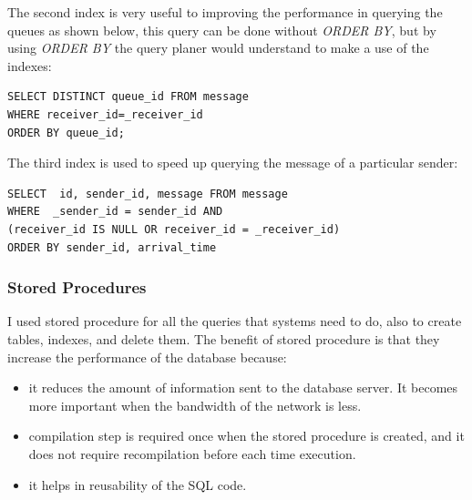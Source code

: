 \documentclass[11pt]{article}
\begin{document}
The second index is very useful to improving the performance 
in querying the queues as shown below, this query can be done without 
\emph{ORDER BY}, but by using \emph{ORDER BY} the query planer would understand to 
make a use of the indexes:

\begin{center}
\begin{tcolorbox}[width=\textwidth, title={Query queues},outer arc=0mm]    
\begin{verbatim}
SELECT DISTINCT queue_id FROM message
WHERE receiver_id=_receiver_id
ORDER BY queue_id;
\end{verbatim}
\end{tcolorbox}  
\end{center}

The third index is used to speed up querying the message of a particular 
sender:

\begin{center}
\begin{tcolorbox}[width=\textwidth,title={Query message of a particular sender},outer arc=0mm]    
\begin{verbatim}
SELECT  id, sender_id, message FROM message
WHERE  _sender_id = sender_id AND
(receiver_id IS NULL OR receiver_id = _receiver_id)
ORDER BY sender_id, arrival_time
\end{verbatim}
\end{tcolorbox}  
\end{center}

\subsubsection{Stored Procedures}\label{sec:stored-procedures}
I used stored procedure for all the queries that systems need to do, also to create
tables, indexes, and delete them. The benefit of stored procedure is that they increase 
the performance of the database because:
\begin{itemize}
 \item it reduces the amount of information sent to the database server. It becomes more 
 important when the bandwidth of the network is less. 
 \item compilation step is required once when the stored procedure is created, and it 
 does not require recompilation before each time execution.
 \item it helps in reusability of the SQL code. 
\end{itemize}
\end{document}
